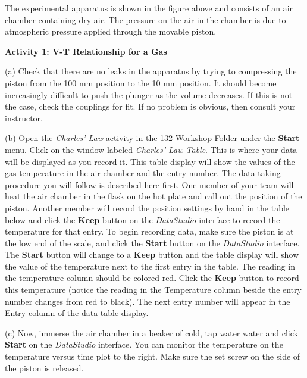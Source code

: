 The experimental apparatus is shown in the figure above and consists
of an air chamber containing dry air. The pressure on the air in the chamber is due to atmospheric
pressure applied through the movable piston.

\textbf{Activity 1: V-T Relationship for a Gas}

(a) Check that there are no leaks in the apparatus by trying to compressing
the piston from the 100 mm position to the 10 mm position. It should become
increasingly difficult to push the plunger as the volume decreases. If this
is not the case, check the couplings for fit. If no problem is obvious, then
consult your instructor. 

(b) Open the {\it Charles' Law} activity in the 132 Workshop Folder under the
{\bf Start} menu.
Click on the window labeled \textit{Charles' Law Table}. 
This is where your data will be displayed as you record
it. This table display will show the values of the gas temperature in the air chamber
and the entry number.
The data-taking procedure you will follow is described here first.
One member of your team will heat the air chamber in the flask on the hot plate 
and call out the position of the piston.
Another member will record the position settings by hand in the table below
and
click the {\bf Keep} button on the {\it DataStudio} interface to record the 
temperature for that entry.
To begin recording data, make sure the piston is at the low end of the scale, and click
the {\bf Start} button on the {\it DataStudio} interface. 
The {\bf Start} button will change to a {\bf Keep} button and the table
display will show the value of the temperature next to the first entry in the table. 
The reading in the temperature column should be colored red.
Click the {\bf Keep} button to record this temperature (notice the reading in the Temperature
column beside the entry number changes from red to black). The next entry number
 will appear in the Entry column of the data table display.


(c) Now, immerse the air chamber in a beaker of cold, tap water water and click
{\bf Start} on the {\it DataStudio} interface. You can monitor the temperature
on the temperature versus time plot to the right.
Make sure the set screw on the side of the piston is released.

